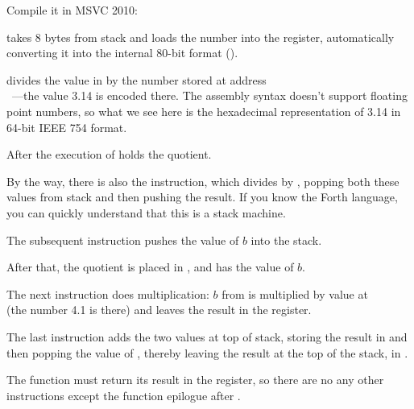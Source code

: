 
Compile it in MSVC 2010:



\FLD takes 8 bytes from stack and loads the number into the  register, automatically converting 
it into the internal 80-bit format ().


\FDIV divides the value in  by the number stored at address \\
~---the value 3.14 is encoded there. 
The assembly syntax doesn't support floating point numbers, so 
what we see here is the hexadecimal representation of 3.14 in 64-bit IEEE 754 format.

After the execution of \FDIV {} holds the \gls{quotient}.


By the way, there is also the \FDIVP instruction, which divides  by , 
popping both these values from stack and then pushing the result. 
If you know the Forth language\FNURLFORTH,
you can quickly understand that this is a stack machine\FNURLSTACK.

The subsequent \FLD instruction pushes the value of $b$ into the stack.

After that, the quotient is placed in , and  has the value of $b$.


The next \FMUL instruction does multiplication: $b$ from  is multiplied by value at\\
 (the number 4.1 is there) and leaves the result in the  register.


The last \FADDP instruction adds the two values at top of stack, storing the result in  
and then popping the value of , thereby leaving the result at the top of the stack, in .

The function must return its result in the  register, 
so there are no any other instructions except the function epilogue after \FADDP.


